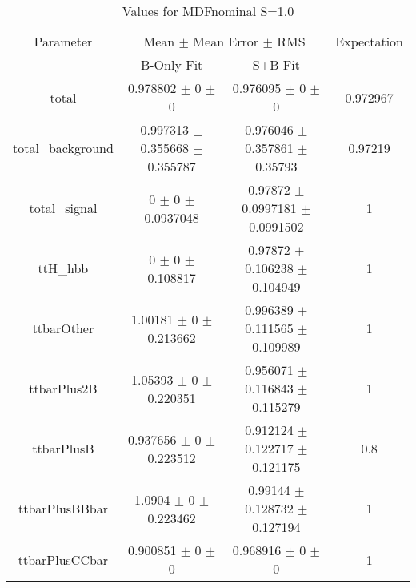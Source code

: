 \begin{table}
\centering
\caption{Values for MDFnominal S=1.0}
\begin{tabular}{cccc}
\toprule
Parameter & \multicolumn{2}{c}{Mean $\pm$ Mean Error $\pm$ RMS} & Expectation\\
 & B-Only Fit & S+B Fit & \\
\midrule
total & \num{0.978802} $\pm$ \num{0} $\pm$ \num{0} & \num{0.976095} $\pm$ \num{0} $\pm$ \num{0} & \num{0.972967}\\
total\_background & \num{0.997313} $\pm$ \num{0.355668} $\pm$ \num{0.355787} & \num{0.976046} $\pm$ \num{0.357861} $\pm$ \num{0.35793} & \num{0.97219}\\
total\_signal & \num{0} $\pm$ \num{0} $\pm$ \num{0.0937048} & \num{0.97872} $\pm$ \num{0.0997181} $\pm$ \num{0.0991502} & \num{1}\\
ttH\_hbb & \num{0} $\pm$ \num{0} $\pm$ \num{0.108817} & \num{0.97872} $\pm$ \num{0.106238} $\pm$ \num{0.104949} & \num{1}\\
ttbarOther & \num{1.00181} $\pm$ \num{0} $\pm$ \num{0.213662} & \num{0.996389} $\pm$ \num{0.111565} $\pm$ \num{0.109989} & \num{1}\\
ttbarPlus2B & \num{1.05393} $\pm$ \num{0} $\pm$ \num{0.220351} & \num{0.956071} $\pm$ \num{0.116843} $\pm$ \num{0.115279} & \num{1}\\
ttbarPlusB & \num{0.937656} $\pm$ \num{0} $\pm$ \num{0.223512} & \num{0.912124} $\pm$ \num{0.122717} $\pm$ \num{0.121175} & \num{0.8}\\
ttbarPlusBBbar & \num{1.0904} $\pm$ \num{0} $\pm$ \num{0.223462} & \num{0.99144} $\pm$ \num{0.128732} $\pm$ \num{0.127194} & \num{1}\\
ttbarPlusCCbar & \num{0.900851} $\pm$ \num{0} $\pm$ \num{0} & \num{0.968916} $\pm$ \num{0} $\pm$ \num{0} & \num{1}\\
\bottomrule
\end{tabular}
\end{table}
